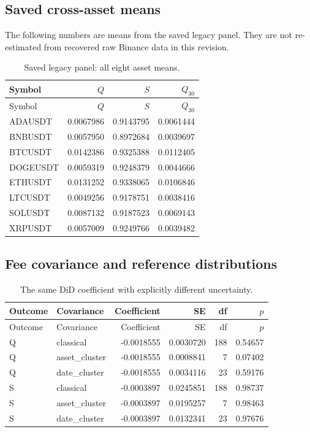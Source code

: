 \subsection{Saved cross-asset means}
The following numbers are means from the saved legacy panel. They are not re-estimated from recovered raw Binance data in this revision.
\begin{longtable}{lrrr}
\caption{Saved legacy panel: all eight asset means.}\\
\toprule Symbol & $Q$ & $S$ & $Q_{30}$\\\midrule\endfirsthead
\toprule Symbol & $Q$ & $S$ & $Q_{30}$\\\midrule\endhead
\bottomrule\endfoot
ADAUSDT & 0.0067986 & 0.9143795 & 0.0061444\\
BNBUSDT & 0.0057950 & 0.8972684 & 0.0039697\\
BTCUSDT & 0.0142386 & 0.9325388 & 0.0112405\\
DOGEUSDT & 0.0059319 & 0.9248379 & 0.0044666\\
ETHUSDT & 0.0131252 & 0.9338065 & 0.0106846\\
LTCUSDT & 0.0049256 & 0.9178751 & 0.0038416\\
SOLUSDT & 0.0087132 & 0.9187523 & 0.0069143\\
XRPUSDT & 0.0057009 & 0.9249766 & 0.0039482\\
\end{longtable}
\subsection{Fee covariance and reference distributions}
\begin{longtable}{llrrrr}
\caption{The same DiD coefficient with explicitly different uncertainty.}\\
\toprule Outcome & Covariance & Coefficient & SE & df & $p$\\\midrule\endfirsthead
\toprule Outcome & Covariance & Coefficient & SE & df & $p$\\\midrule\endhead
\bottomrule\endfoot
Q & classical & -0.0018555 & 0.0030720 & 188 & 0.54657\\
Q & asset\_cluster & -0.0018555 & 0.0008841 & 7 & 0.07402\\
Q & date\_cluster & -0.0018555 & 0.0034116 & 23 & 0.59176\\
S & classical & -0.0003897 & 0.0245851 & 188 & 0.98737\\
S & asset\_cluster & -0.0003897 & 0.0195257 & 7 & 0.98463\\
S & date\_cluster & -0.0003897 & 0.0132341 & 23 & 0.97676\\
\end{longtable}
